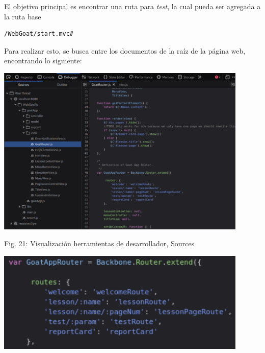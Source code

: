\documentclass[12pt,oneside,a4paper]{book}
\begin{document}
\begin{enumerate}
\begin{enumerate}
        \hspace{20pt}
        El objetivo principal es encontrar una ruta para \textit{test}, la cual pueda ser agregada a la ruta base

        \vspace{1em}

        \begin{verbatim}
/WebGoat/start.mvc#
        \end{verbatim}

        \hspace{20pt}
        Para realizar esto, se busca entre los documentos de la raíz de la página web, encontrando lo siguiente:

        \vspace{2em} 
        
        \begin{center}
            \includegraphics[width=12cm]{img/xss7.png}
            
            \vspace{0.1em}
            
            Fig. 21: Visualización herramientas de desarrollador, Sources
        \end{center}
        
        \vspace{2em}

        \begin{center}
            \includegraphics[width=12cm]{img/xss8.png}
            

\end{center}
\end{enumerate}
\end{enumerate}
\end{document}
